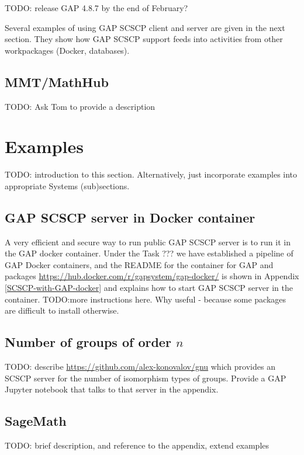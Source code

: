 \documentclass{deliverablereport}
\begin{document}
TODO: release GAP 4.8.7 by the end of February?

Several examples of using GAP SCSCP client and server are given
in the next section. They show how GAP SCSCP support feeds into
activities from other workpackages (Docker, databases).


\subsection{MMT/MathHub}

TODO: Ask Tom to provide a description


\section{Examples}\label{examples}

TODO: introduction to this section. Alternatively, just incorporate 
examples into appropriate Systems (sub)sections.

\subsection{GAP SCSCP server in Docker container}

A very efficient and secure way to run public GAP SCSCP
server is to run it in the GAP docker container. Under the
Task ??? we have established a pipeline of GAP Docker 
containers, and the README for the container for GAP and
packages \url{https://hub.docker.com/r/gapsystem/gap-docker/}
is shown in Appendix \ref{SCSCP-with-GAP-docker} and explains
how to start GAP SCSCP server in the container.
TODO:more instructions here. Why useful - because some packages
are difficult to install otherwise.


\subsection{Number of groups of order $n$}\label{gnu-reproducibility}

TODO: describe \url{https://github.com/alex-konovalov/gnu} which provides
an SCSCP server for the number of isomorphism types of groups. Provide
a GAP Jupyter notebook that talks to that server in the appendix.


\subsection{SageMath}

TODO: brief description, and reference to the appendix, extend examples
\end{document}
